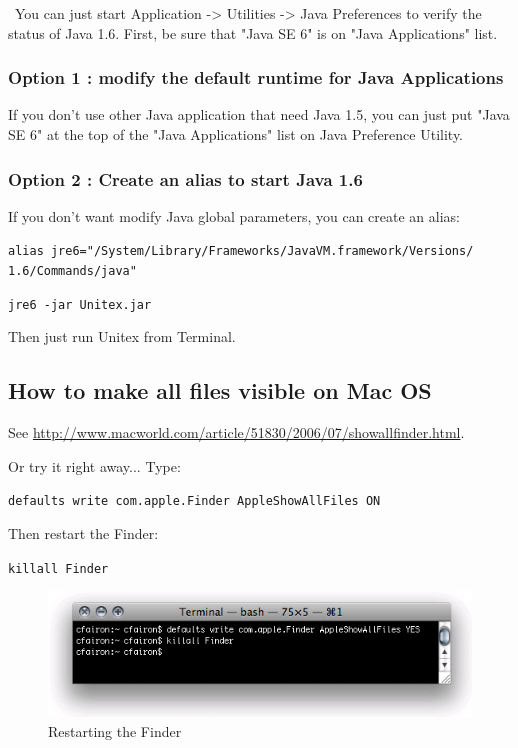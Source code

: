 \noindent\ You can just start Application -> Utilities -> Java Preferences to verify the status of Java 1.6. First, be sure that "Java SE 6" is on "Java Applications" list.

\subsubsection{Option 1 : modify the default runtime for Java Applications}
\noindent If you don't use other Java application that need Java 1.5, you can just put "Java SE 6" at the top of the "Java Applications" list on Java Preference Utility.

\subsubsection{Option 2 : Create an alias to start Java 1.6}
\noindent If you don't want modify Java global parameters, you can create an
alias:

\bigskip
\noindent \verb+alias jre6="/System/Library/Frameworks/JavaVM.framework/Versions/+
\noindent \verb+1.6/Commands/java"+
   
\bigskip
\noindent \verb+jre6 -jar Unitex.jar+

\bigskip
\noindent Then just run Unitex from Terminal.





\subsection{How to make all files visible on Mac OS}
\noindent See
\url{http://www.macworld.com/article/51830/2006/07/showallfinder.html}.

\bigskip
\noindent Or try it right away... Type: 

\bigskip
\verb+defaults write com.apple.Finder AppleShowAllFiles ON+

\bigskip
\noindent Then restart the Finder:

\bigskip
\verb+killall Finder+

\begin{figure}[!h]
\begin{center}
\includegraphics[width=12cm]{resources/img/fig-mac6.png}
\caption{Restarting the Finder\label{fig-mac6}}
\end{center}
\end{figure}

